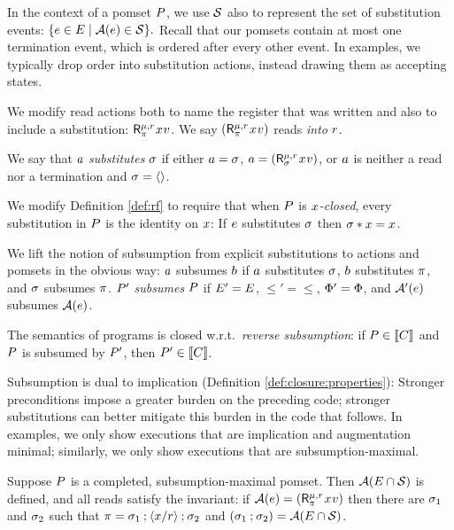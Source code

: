 In the context of a
pomset $P$, we use $\mathcal{S}$ also to represent the set of substitution
events:
\begin{math}
  \{ e\in E \mid \mathcal{A}(e) \in \mathcal{S} \}.
\end{math}
Recall that our pomsets contain at most one termination event, which is ordered
after every other event.  
In examples, we typically drop order into
substitution actions, instead drawing them as accepting states.

We modify read actions both to name the register that was written
and also to include a substitution:
$\DRreg[\amode]{\aReg}{\bSub}{\aLoc}{\aVal}$.
We say $(\DRreg[\amode]{\aReg}{\bSub}{\aLoc}{\aVal})$ reads \emph{into}
$r$.

We say that $a$ \emph{substitutes} $\sigma$ if either
$a=\sigma$, $\aAct=(\DRreg[\amode]{\aReg}{\aSub}{\aLoc}{\aVal})$, or
$a$ is neither a read nor a termination and $\sigma=\langle\rangle$.

We modify Definition \ref{def:rf} to require that when $P$ is
\emph{$x$-closed}, every substitution in $P$ is the identity on
$x$: If $e$ substitutes $\sigma$ then $\sigma\mathbin{\ast}x=x$.

We lift the notion of subsumption from explicit substitutions to actions and
pomsets in the obvious way: $a$ subsumes $b$ if 
$a$ substitutes $\sigma$,
$b$ substitutes $\pi$, and $\sigma$ subsumes
$\pi$.
$P'$ \emph{subsumes} $P$ if $E'=E$, ${\le'}={\le}$,
$\Phi'=\Phi$, and $\mathcal{A}'(e)$
subsumes $\mathcal{A}(e)$. 

The semantics of programs is closed w.r.t.~\emph{reverse subsumption}: if
$P\in\llbracket C\rrbracket$ and $P$ is subsumed by $P'$, then
$P'\in\llbracket C\rrbracket$.

Subsumption is dual to implication (Definition \ref{def:closure:properties}):
Strong\-er preconditions impose a greater burden on the preceding code;
stronger substitutions can better mitigate this burden in the code that
follows.  In examples, we only show executions that are implication and
augmentation minimal; similarly, we only show executions that are
subsumption-maximal.

Suppose $P$ is a completed, subsumption-maximal pomset.  Then
$\mathcal{A}(E\cap\mathcal{S})$ is defined, and all reads satisfy the invariant:
if $\labelingAct(\aEv)=(\DRreg[\amode]{\aReg}{\bSub}{\aLoc}{\aVal})$ then there are
$\sigma_1$ and $\sigma_2$ such that
$\pi=\sigma_1\mathbin{;}\langle x/r\rangle\mathbin{;}\sigma_2$ and
$(\sigma_1\mathbin{;}\sigma_2) = \mathcal{A}(E\cap\mathcal{S})$.




